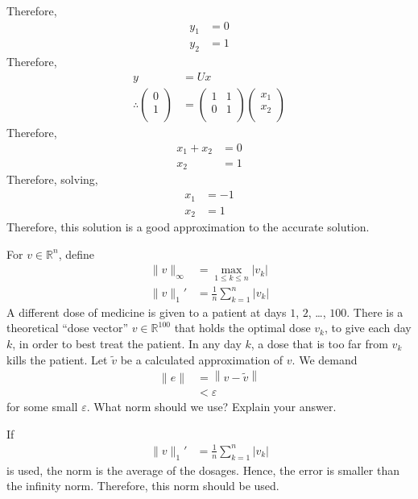 \documentclass[fleqn, a4paper, 11pt, oneside]{amsart}
\theoremstyle{definition}
\theoremstyle{theorem}
\begin{document}
\begin{solution}
\begin{enumerate}[leftmargin=*]
			Therefore,
			\begin{align*}
				y_1 & = 0 \\
				y_2 & = 1
			\end{align*}
			Therefore,
			\begin{align*}
				y &= U x\\
				\therefore
					\begin{pmatrix}
						0 \\
						1 \\
					\end{pmatrix}
				&=
					\begin{pmatrix}
						1 & 1 \\
						0 & 1 \\
					\end{pmatrix}
					\begin{pmatrix}
						x_1 \\
						x_2 \\
					\end{pmatrix}
			\end{align*}
			Therefore,
			\begin{align*}
				x_1 + x_2 & = 0 \\
				x_2       & = 1
			\end{align*}
			Therefore, solving,
			\begin{align*}
				x_1 & = -1 \\
				x_2 & = 1
			\end{align*}
			Therefore, this solution is a good approximation to the accurate solution.
	\end{enumerate}
\end{solution}

\begin{question}
	For $v \in \mathbb{R}^n$, define
	\begin{align*}
		\|v\|_{\infty} & = \max\limits_{1 \le k \le n} |v_k| \\
		{\|v\|_1}'     & = \frac{1}{n} \sum\limits_{k = 1}^{n} |v_k|
	\end{align*}
	A different dose of medicine is given to a patient at days $1$, $2$, \dots, $100$.
	There is a theoretical ``dose vector'' $v \in \mathbb{R}^{100}$ that holds the optimal dose $v_k$, to give each day $k$, in order to best treat the patient.
	In any day $k$, a dose that is too far from $v_k$ kills the patient.
	Let $\tilde{v}$ be a calculated approximation of $v$.
	We demand
	\begin{align*}
		\|e\| & = \left\| v - \tilde{v} \right\| \\
                      & < \varepsilon
	\end{align*}
	for some small $\varepsilon$.
	What norm should we use?
	Explain your answer.
\end{question}

\begin{solution}
	If
	\begin{align*}
		{\|v\|_1}' & = \frac{1}{n} \sum\limits_{k = 1}^{n} |v_k|
	\end{align*}
	is used, the norm is the average of the dosages.
	Hence, the error is smaller than the infinity norm.
	Therefore, this norm should be used.
\end{solution}
\end{document}
